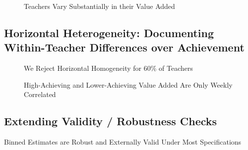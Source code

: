 \documentclass[letterpaper,12pt]{article}
\begin{document}


\begin{figure}
    \centering
    \caption{Teachers Vary Substantially in their Value Added}
    \label{fig:my_label}
\end{figure}


\subsection{Horizontal Heterogeneity: Documenting Within-Teacher Differences over Achievement}



\begin{figure}
    \centering
    \caption{We Reject Horizontal Homogeneity for 60\% of Teachers}
    \label{fig:my_label}
\end{figure}

\begin{figure}
    \centering
    \caption{High-Achieving and Lower-Achieving Value Added Are Only Weekly Correlated}
    \label{fig:my_label}
\end{figure}



\subsection{Extending Validity / Robustness Checks}

\begin{table}[]
    \centering
    \caption{Binned Estimates are Robust and Externally Valid Under Most Specifications}
    \label{tab:my_label}
\end{table}

   
\end{document}

